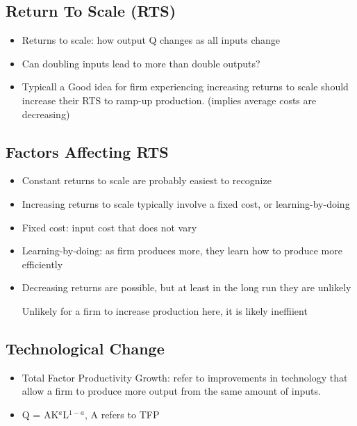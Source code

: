 \documentclass{article}
\begin{document}
\subsection{Return To Scale (RTS)}
\begin{itemize}
  \item Returns to scale: how output Q changes as all inputs change
  \item Can doubling inputs lead to more than double outputs?
  \item Typicall a Good idea for firm experiencing increasing returns to scale
    should increase their RTS to ramp-up production. (implies average costs are decreasing)
\end{itemize}


\subsection{Factors Affecting RTS}
\begin{itemize}
  \item Constant returns to scale are probably easiest to recognize
  \item Increasing returns to scale typically involve a fixed cost, or learning-by-doing
  \item Fixed cost: input cost that does not vary
  \item Learning-by-doing: as firm produces more, they learn how to produce more efficiently
  \item Decreasing returns are possible, but at least in the long run they are unlikely

    Unlikely for a firm to increase production here, it is likely ineffiient
\end{itemize}

\subsection{Technological Change}
\begin{itemize}
  \item Total Factor Productivity Growth: refer to improvements in technology
    that allow a firm to produce more output from the same amount of inputs.
  \item Q = AK$^a$L$^{1-a}$, A refers to TFP
\end{itemize}
\end{document}
